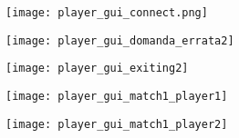 \begin{minipage}{.534\linewidth} %
	\begin{minipage}{.45\linewidth}
		\begin{figure}[H]
			\texttt{[image: player\_gui\_connect.png]}
		\end{figure}
	\end{minipage}
	\hspace{0.05\linewidth}
	\begin{comment}
	\begin{minipage}{.45\linewidth}
	\begin{figure}[H]
	\texttt{[image: player\_gui\_tre\_domande2.png]}
	\end{figure}
	\end{minipage}
	\end{comment}
	\hspace{0.05\linewidth}
	\begin{minipage}{.45\linewidth}
		\begin{figure}[H]
			\texttt{[image: player\_gui\_domanda\_errata2]}
		\end{figure}
	\end{minipage}
	\hspace{0.05\linewidth}
	\begin{minipage}{.45\linewidth}
		\begin{figure}[H]
			\texttt{[image: player\_gui\_exiting2]}
		\end{figure}
	\end{minipage}
	\hspace{0.05\linewidth}
	\begin{minipage}{.45\linewidth}
		\begin{figure}[H]
			\texttt{[image: player\_gui\_match1\_player1]}
		\end{figure}
	\end{minipage}
	\hspace{0.05\linewidth}
	\begin{minipage}{.45\linewidth}
		\begin{figure}[H]
			\texttt{[image: player\_gui\_match1\_player2]}
		\end{figure}
	\end{minipage}
\end{minipage}

